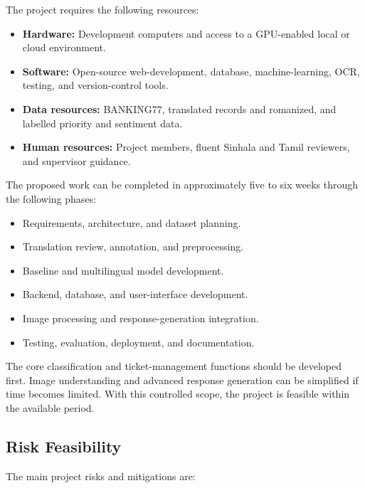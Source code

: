 \documentclass[11pt,a4paper]{article}
\begin{document}
The project requires the following resources:

\begin{itemize}
    \item \textbf{Hardware:} Development computers and access to a GPU-enabled local or cloud environment.
    \item \textbf{Software:} Open-source web-development, database, machine-learning, OCR, testing, and version-control tools.
    \item \textbf{Data resources:} BANKING77, translated records and romanized, and labelled priority and sentiment data.
    \item \textbf{Human resources:} Project members, fluent Sinhala and Tamil reviewers, and supervisor guidance.
\end{itemize}

The proposed work can be completed in approximately five to six weeks through the following phases:

\begin{itemize}
    \item Requirements, architecture, and dataset planning.
    \item Translation review, annotation, and preprocessing.
    \item Baseline and multilingual model development.
    \item Backend, database, and user-interface development.
    \item Image processing and response-generation integration.
    \item Testing, evaluation, deployment, and documentation.
\end{itemize}

The core classification and ticket-management functions should be developed first. Image understanding and advanced response generation can be simplified if time becomes limited. With this controlled scope, the project is feasible within the available period.

\subsection{Risk Feasibility}

The main project risks and mitigations are:
\end{document}
